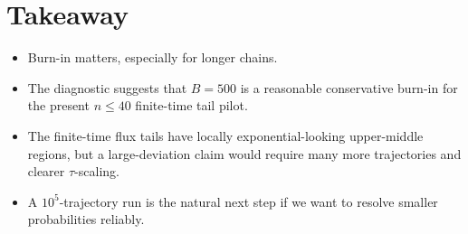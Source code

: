 \documentclass[11pt]{article}
\begin{document}
\section*{Takeaway}

\begin{itemize}
    \item Burn-in matters, especially for longer chains.
    \item The diagnostic suggests that $B=500$ is a reasonable conservative
    burn-in for the present $n\le 40$ finite-time tail pilot.
    \item The finite-time flux tails have locally exponential-looking
    upper-middle regions, but a large-deviation claim would require many more
    trajectories and clearer $\tau$-scaling.
    \item A $10^5$-trajectory run is the natural next step if we want to
    resolve smaller probabilities reliably.
\end{itemize}
\end{document}
